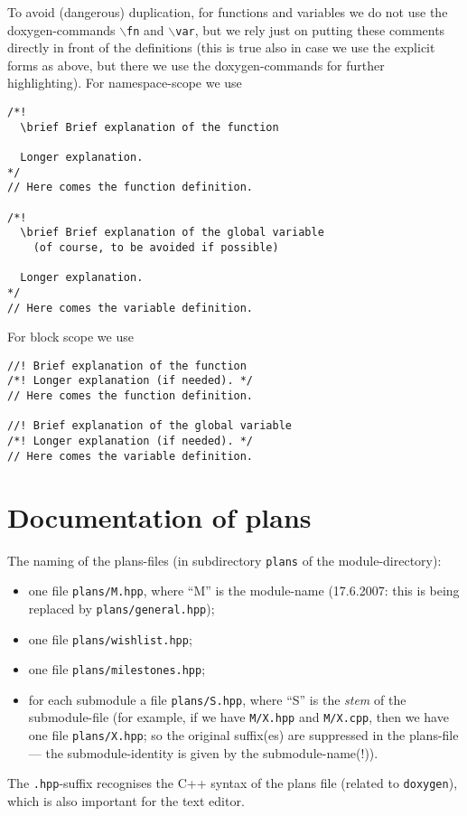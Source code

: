 \documentclass{book}
\newcommand{\filename}[1]{\texttt{#1}}
\newcommand{\name}[1]{\texttt{#1}}
\begin{document}
To avoid (dangerous) duplication, for functions and variables we do not use the doxygen-commands \texttt{$\backslash$fn} and \texttt{$\backslash$var}, but we rely just on putting these comments directly in front of the definitions (this is true also in case we use the explicit forms as above, but there we use the doxygen-commands for further highlighting). For namespace-scope we use
\begin{verbatim}
/*!
  \brief Brief explanation of the function
  
  Longer explanation.
*/
// Here comes the function definition.

/*!
  \brief Brief explanation of the global variable
    (of course, to be avoided if possible)

  Longer explanation.
*/
// Here comes the variable definition.
\end{verbatim}
For block scope we use
\begin{verbatim}
//! Brief explanation of the function
/*! Longer explanation (if needed). */
// Here comes the function definition.

//! Brief explanation of the global variable
/*! Longer explanation (if needed). */
// Here comes the variable definition.
\end{verbatim}




\section{Documentation of plans}
\label{sec:DoxygenPlans}

The naming of the plans-files (in subdirectory \texttt{plans} of the module-directory):
\begin{itemize}
\item one file \filename{plans/M.hpp}, where ``M'' is the module-name (17.6.2007: this is being replaced by \filename{plans/general.hpp});
\item one file \filename{plans/wishlist.hpp};
\item one file \filename{plans/milestones.hpp};
\item for each submodule a file \filename{plans/S.hpp}, where ``S'' is the \emph{stem} of the submodule-file (for example, if we have \filename{M/X.hpp} and \filename{M/X.cpp}, then we have one file \filename{plans/X.hpp}; so the original suffix(es) are suppressed in the plans-file --- the submodule-identity is given by the submodule-name(!)).
\end{itemize}
The \filename{.hpp}-suffix recognises the C++ syntax of the plans file (related to \name{doxygen}), which is also important for the text editor.
\end{document}
